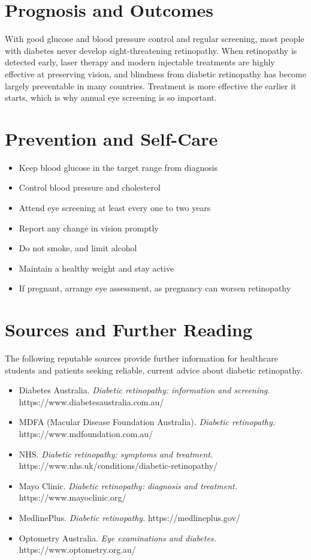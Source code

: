 \section*{Prognosis and Outcomes}
With good glucose and blood pressure control and regular screening, most people with diabetes never develop sight-threatening retinopathy. When retinopathy is detected early, laser therapy and modern injectable treatments are highly effective at preserving vision, and blindness from diabetic retinopathy has become largely preventable in many countries. Treatment is more effective the earlier it starts, which is why annual eye screening is so important.

\section*{Prevention and Self-Care}
\begin{itemize}
    \item Keep blood glucose in the target range from diagnosis
    \item Control blood pressure and cholesterol
    \item Attend eye screening at least every one to two years
    \item Report any change in vision promptly
    \item Do not smoke, and limit alcohol
    \item Maintain a healthy weight and stay active
    \item If pregnant, arrange eye assessment, as pregnancy can worsen retinopathy
\end{itemize}

\section*{Sources and Further Reading}
The following reputable sources provide further information for healthcare students and patients seeking reliable, current advice about diabetic retinopathy.

\begin{itemize}
    \item Diabetes Australia. \textit{Diabetic retinopathy: information and screening.} https://www.diabetesaustralia.com.au/
    \item MDFA (Macular Disease Foundation Australia). \textit{Diabetic retinopathy.} https://www.mdfoundation.com.au/
    \item NHS. \textit{Diabetic retinopathy: symptoms and treatment.} https://www.nhs.uk/conditions/diabetic-retinopathy/
    \item Mayo Clinic. \textit{Diabetic retinopathy: diagnosis and treatment.} https://www.mayoclinic.org/
    \item MedlinePlus. \textit{Diabetic retinopathy.} https://medlineplus.gov/
    \item Optometry Australia. \textit{Eye examinations and diabetes.} https://www.optometry.org.au/
\end{itemize}
